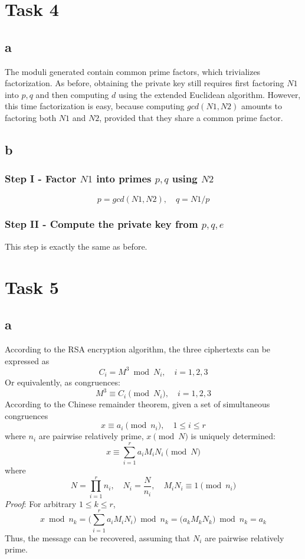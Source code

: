 \documentclass[12pt]{article}
\begin{document}
\section*{Task 4}
\subsection*{a}
The moduli generated contain common prime factors, which trivializes factorization.
As before, obtaining the private key still requires first factoring $N1$ into $p,q$ and then computing $d$ using the extended Euclidean algorithm. However, this time factorization is easy, because computing $gcd(N1,N2)$ amounts to factoring both $N1$ and $N2$, provided that they share a common prime factor. 
\subsection*{b}
\subsubsection*{Step I - Factor $N1$ into primes $p, q$ using $N2$}
\[p = gcd(N1, N2), \quad q = N1/p \]
\subsubsection*{Step II - Compute the private key from $p,q,e$} This step is exactly the same as before.


\section*{Task 5}
\subsection*{a}
According to the RSA encryption algorithm, the three ciphertexts can be expressed as
\[ C_i = M^3 \bmod{N_i},\quad i = 1,2,3 \]
Or equivalently, as congruences:
\[ M^3 \equiv  C_i \pmod{N_i},\quad i = 1,2,3 \]
According to the Chinese remainder theorem, given a set of simultaneous congruences
\[ x \equiv a_i \pmod{n_i}, \quad 1 \leq i \leq r \]
where $n_i$ are pairwise relatively prime, $x \pmod{N}$ is uniquely determined:
\[ x \equiv \sum_{i=1}^{r}a_iM_iN_i \pmod{N} \tag{$\star$}\]
where
\[ N = \prod_{i=1}^r n_i,\quad N_i = \frac{N}{n_i}, \quad M_i N_i \equiv 1 \pmod{n_i} \]
\textit{Proof}: For arbitrary $1 \leq k \leq r$,
\[ x\bmod{n_k} = \Big(\sum_{i=1}^{r}a_iM_iN_i\Big) \bmod{n_k} = \Big(a_kM_kN_k\Big) \bmod{n_k} = a_k \]
Thus, the message can be recovered, assuming that $N_i$ are pairwise relatively prime.
\end{document}
